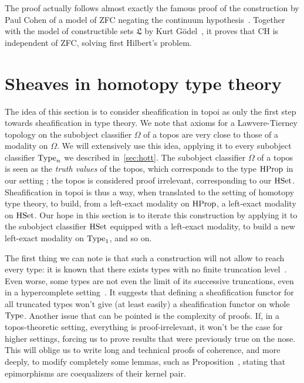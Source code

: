 The proof actually follows almost exactly the famous proof of the
construction by Paul Cohen of a model of ZFC negating the continuum
hypothesis~\cite{cohen1966}. Together with the model of constructible
sets $\mathfrak L$ by Kurt Gödel~\cite{godel40}, it proves that CH is
independent of ZFC, solving first Hilbert's problem.


\section{Sheaves in homotopy type theory}
\label{sec:sheaf_hott}

The idea of this section is to consider sheafification in topoi as
only the first step towards sheafification in type theory. 
We note that axioms for a Lawvere-Tierney topology on the subobject
classifier $\Omega$ of a topos are very close to
those of a modality on $\Omega$. We will extensively use this idea,
applying it to every subobject classifier $\operatorname{Type}_n$ we described
in~\ref{sec:hott}. The subobject
classifier $\Omega$ of a topos is seen as the {\em truth values} of the
topos, which corresponds to the type $\operatorname{HProp}$ in our setting ; the
topos is considered proof irrelevant, corresponding to our
$\operatorname{HSet}$. Sheafification in topoi is thus a way, when translated to the
setting of homotopy type theory, to build, from a left-exact modality on
$\operatorname{HProp}$, a left-exact modality on $\operatorname{HSet}$. Our hope in this section
is to iterate this construction by applying it to the subobject
classifier $\operatorname{HSet}$ equipped with a left-exact modality, to build a new
left-exact modality on $\operatorname{Type}_1$, and so on. 

The first thing we can
note is that such a construction will not allow to reach every type:
it is known that there exists types with no finite truncation
level~\cite[Example 8.8.6]{hottbook}. Even worse, some types are not
even the limit of its successive truncations, even in a hypercomplete
setting~\cite{morelvv}. It suggests that defining a sheafification
functor for all truncated types won't give (at least easily) a
sheafification functor on whole $\operatorname{Type}$.
Another issue that can be pointed is the complexity of proofs. If, in
a topos-theoretic setting, everything is proof-irrelevant, it won't be
the case for higher settings, forcing us to prove results that were
previously true on the nose. This will oblige us to write long and
technical proofs of coherence, and more deeply, to modify completely
some lemmas, such as Proposition~\cite[IV.7.8]{maclanemoerdijk},
stating that epimorphisms are coequalizers of their kernel pair.

